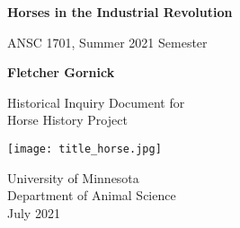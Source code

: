 \begin{titlepage}
    \begin{center}
        \vspace*{1cm}
            
        \Huge
        \textbf{Horses in the Industrial Revolution}
            
        \vspace{0.5cm}
        \LARGE
        ANSC 1701, Summer 2021 Semester
            
        \vspace{1.5cm}
            
        \textbf{Fletcher Gornick}
            
        \vfill
            
        Historical Inquiry Document for\\
        Horse History Project
            
        \vspace{0.8cm}
            
        \texttt{[image: title\_horse.jpg]}
        
        \vspace{1cm}
        \Large
        University of Minnesota \\
        Department of Animal Science \\
        July 2021
            
    \end{center}
\end{titlepage}